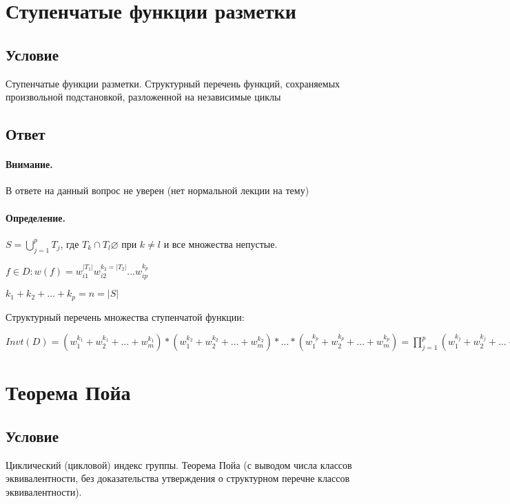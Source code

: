 \documentclass{report}
\begin{document}
\newpage


\section{Ступенчатые функции разметки}
\subsection{Условие}
Ступенчатые функции разметки. Структурный перечень функций, сохраняемых
произвольной подстановкой, разложенной на независимые циклы

\subsection{Ответ}

\paragraph*{Внимание.} В ответе на данный вопрос не уверен (нет нормальной лекции на тему)


\paragraph*{Определение.}
$S = \bigcup_{j=1}^{p} T_{j}$, где $T_{k} \cap T_{l} \varnothing$ при $k \neq l$ и все множества
непустые.


$f \in D: w(f) = w_{i1}^{|T_1|} w_{i2}^{k_2=|T_2|}\ldots w_{ip}^{k_{p}}$ 


$k_1+k_2+\ldots+k_{p} = n = |S|$ 

\medskip


Структурный перечень множества ступенчатой функции:


$Invt(D) = (w_1^{k_1} + w_2^{k_1} + \ldots + w_{m}^{k_1}) * (w_1^{k_2} + w_2^{k_2} + \ldots + w_{m}^{k_2})*
\ldots * (w_1^{k_{p}} + w_2^{k_{p}} + \ldots + w_{m}^{k_{p}}) = 
\prod_{j=1}^{p}(w_1^{k_{j}} + w_2^{k_{j}} + \ldots + w_{m}^{k_{j}})  $


\newpage


\section{Теорема Пойа}
\subsection{Условие}
Циклический (цикловой) индекс группы. Теорема Пойа (с выводом числа классов
эквивалентности, без доказательства утверждения о структурном перечне классов
эквивалентности).
\end{document}
